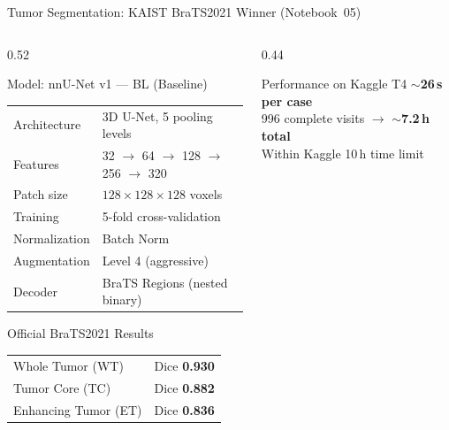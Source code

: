 \documentclass[aspectratio=169, dvipsnames]{beamer}
\begin{document}
\begin{frame}{Tumor Segmentation: KAIST BraTS2021 Winner (Notebook~05)}
    \begin{columns}
        \begin{column}{0.52\textwidth}
            \begin{block}{Model: nnU-Net v1 — BL (Baseline)}
                \small
                \begin{tabular}{ll}
                    \toprule
                    Architecture & 3D U-Net, 5 pooling levels \\
                    Features & 32 $\to$ 64 $\to$ 128 $\to$ 256 $\to$ 320 \\
                    Patch size & $128{\times}128{\times}128$ voxels \\
                    Training & 5-fold cross-validation \\
                    Normalization & Batch Norm \\
                    Augmentation & Level 4 (aggressive) \\
                    Decoder & BraTS Regions (nested binary) \\
                    \bottomrule
                \end{tabular}
            \end{block}

            \vspace{0.2em}

            \begin{block}{\small Official BraTS2021 Results}
                \scriptsize
                \begin{tabular}{lc}
                    Whole Tumor (WT) & Dice \textbf{0.930} \\
                    Tumor Core (TC) & Dice \textbf{0.882} \\
                    Enhancing Tumor (ET) & Dice \textbf{0.836} \\
                \end{tabular}
            \end{block}
        \end{column}

        \begin{column}{0.44\textwidth}
            \begin{exampleblock}{Performance on Kaggle T4}
                \small
                $\sim$\textbf{26\,s per case}\\
                996 complete visits $\to$ $\sim$\textbf{7.2\,h total}\\
                Within Kaggle 10\,h time limit 
            \end{exampleblock}


\end{column}
\end{columns}
\end{frame}
\end{document}
